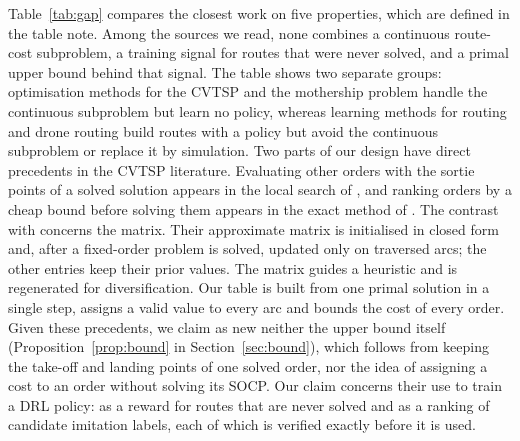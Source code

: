 \documentclass[preprint,12pt,authoryear]{elsarticle}
\begin{document}
Table~\ref{tab:gap} compares the closest work on five properties, which are defined in the table note. Among the sources we read, none combines a continuous route-cost subproblem, a training signal for routes that were never solved, and a primal upper bound behind that signal. The table shows two separate groups: optimisation methods for the CVTSP and the mothership problem handle the continuous subproblem but learn no policy, whereas learning methods for routing and drone routing build routes with a policy but avoid the continuous subproblem or replace it by simulation. Two parts of our design have direct precedents in the CVTSP literature. Evaluating other orders with the sortie points of a solved solution appears in the local search of \citet{erdogan2021}, and ranking orders by a cheap bound before solving them appears in the exact method of \citet{gambella2018}. The contrast with \citet{li2025} concerns the matrix. Their approximate matrix is initialised in closed form and, after a fixed-order problem is solved, updated only on traversed arcs; the other entries keep their prior values. The matrix guides a heuristic and is regenerated for diversification. Our table is built from one primal solution in a single step, assigns a valid value to every arc and bounds the cost of every order. Given these precedents, we claim as new neither the upper bound itself (Proposition~\ref{prop:bound} in Section~\ref{sec:bound}), which follows from keeping the take-off and landing points of one solved order, nor the idea of assigning a cost to an order without solving its SOCP. Our claim concerns their use to train a DRL policy: as a reward for routes that are never solved and as a ranking of candidate imitation labels, each of which is verified exactly before it is used.
\end{document}
